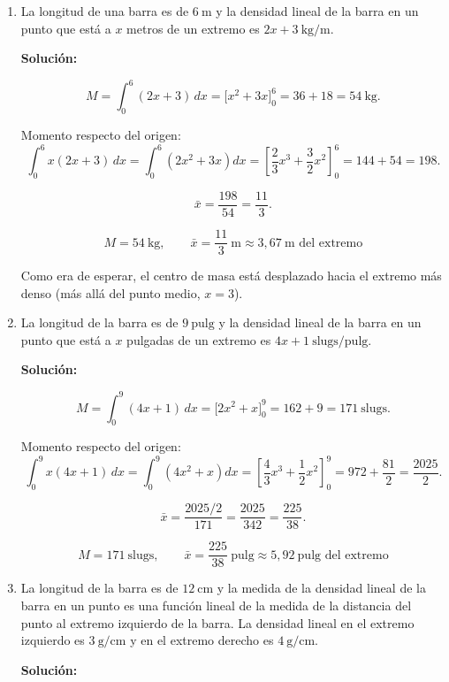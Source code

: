 \documentclass[12pt]{article}
\newcommand{\solucion}{%
    \vspace{0.8em}%
    \textbf{Solución:}%
}
\begin{document}
\begin{enumerate}[label=\alph*.-]

    \item La longitud de una barra es de $6\ \text{m}$ y la densidad
    lineal de la barra en un punto que está a $x$ metros de un extremo es
    $2x+3\ \text{kg/m}$.

    \solucion

    \[
    M=\int_{0}^{6}(2x+3)\,dx=\Big[x^2+3x\Big]_{0}^{6}=36+18=54\ \text{kg}.
    \]

    Momento respecto del origen:
    \[
    \int_{0}^{6}x(2x+3)\,dx=\int_{0}^{6}\left(2x^2+3x\right)dx
    =\left[\frac23x^3+\frac32x^2\right]_{0}^{6}=144+54=198.
    \]

    \[
    \bar x=\frac{198}{54}=\frac{11}{3}.
    \]

    \[
    \boxed{
    M=54\ \text{kg},
    \qquad
    \bar x=\frac{11}{3}\ \text{m}\approx3{,}67\ \text{m del extremo}
    }
    \]

    Como era de esperar, el centro de masa está desplazado hacia el
    extremo más denso (más allá del punto medio, $x=3$).


    \item La longitud de la barra es de $9\ \text{pulg}$ y la densidad
    lineal de la barra en un punto que está a $x$ pulgadas de un extremo
    es $4x+1\ \text{slugs/pulg}$.

    \solucion

    \[
    M=\int_{0}^{9}(4x+1)\,dx=\Big[2x^2+x\Big]_{0}^{9}=162+9=171\ \text{slugs}.
    \]

    Momento respecto del origen:
    \[
    \int_{0}^{9}x(4x+1)\,dx=\int_{0}^{9}\left(4x^2+x\right)dx
    =\left[\frac43x^3+\frac12x^2\right]_{0}^{9}=972+\frac{81}{2}=\frac{2025}{2}.
    \]

    \[
    \bar x=\frac{2025/2}{171}=\frac{2025}{342}=\frac{225}{38}.
    \]

    \[
    \boxed{
    M=171\ \text{slugs},
    \qquad
    \bar x=\frac{225}{38}\ \text{pulg}\approx5{,}92\ \text{pulg del extremo}
    }
    \]


    \item La longitud de la barra es de $12\ \text{cm}$ y la medida de
    la densidad lineal de la barra en un punto es una función lineal de
    la medida de la distancia del punto al extremo izquierdo de la barra.
    La densidad lineal en el extremo izquierdo es $3\ \text{g/cm}$ y en
    el extremo derecho es $4\ \text{g/cm}$.

    \solucion


\end{enumerate}
\end{document}
